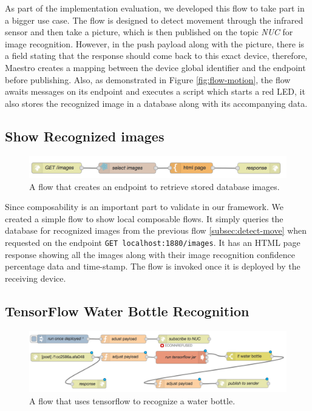 As part of the implementation evaluation, we developed this flow to take part in a bigger use case. The flow is designed to detect movement through the infrared sensor and then take a picture, which is then published on the topic \textit{NUC} for image recognition. However, in the push payload along with the picture, there is a field stating that the response should come back to this exact device, therefore, Maestro creates a mapping between the device global identifier and the endpoint before publishing. Also, as demonstrated in Figure \ref{fig:flow-motion}, the flow awaits messages on its endpoint and executes a script which starts a red LED, it also stores the recognized image in a database along with its accompanying data. 


\subsection{Show Recognized images}\label{subsec:images}

\begin{figure}[H]
	\centering
	\includegraphics[scale=0.6]{images/flow-images.png}
	\caption{A flow that creates an endpoint to retrieve stored database images.}
	\label{fig:flow-image}
\end{figure}

Since composability is an important part to validate in our framework. We created a simple flow to show local composable flows. It simply queries the database for recognized images from the previous flow \ref{subsec:detect-move} when requested on the endpoint \verb|GET localhost:1880/images|. It has an HTML page response showing all the images along with their image recognition confidence percentage data and time-stamp. The flow is invoked once it is deployed by the receiving device.


\subsection{TensorFlow Water Bottle Recognition} \label{subsec:tensor}
 \begin{figure}[H]
	\centering
	\includegraphics[scale=0.6]{images/flow-tensor.png}
	\caption{A flow that uses tensorflow to recognize a water bottle.}
	\label{fig:flow-tensor}
\end{figure} 

